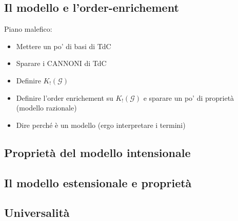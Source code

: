 \documentclass{beamer}
\begin{document}
%
%	
%	
%	
%
%
%
%	
%	
%	
%	
%	
%	
%
%
%	
%	
%	












\subsection{Il modello e l'order-enrichement}

\begin{frame}
	Piano malefico:
	\begin{itemize}
	\item	Mettere un po' di basi di TdC
	\item Sparare i CANNONI di TdC
	\item Definire $K_! (\mathcal{G})$
	\item Definire l'order enrichement su $K_! (\mathcal{G})$ e sparare un po' di proprietà (modello razionale)
	\item Dire perché è un modello (ergo interpretare i termini)
	\end{itemize}
\end{frame}


\subsection{Proprietà del modello intensionale}
\subsection{Il modello estensionale e proprietà}
\subsection{Universalità}
\end{document}
